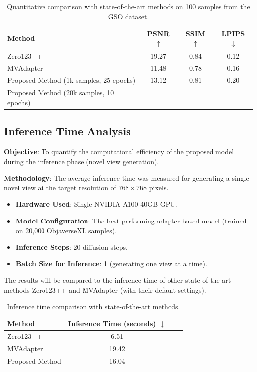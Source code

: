 \begin{table}[htbp]
  \centering
  \caption{Quantitative comparison with state-of-the-art methods on 100 samples from the GSO dataset.}
  \label{tab:sota_comparison_gso}
  \begin{tabular}{lccc}
    \toprule
    \textbf{Method} & \textbf{PSNR} $\uparrow$ & \textbf{SSIM} $\uparrow$ & \textbf{LPIPS} $\downarrow$ \\
    \midrule
    Zero123++ \cite{zero1to3} & 19.27 & 0.84 & 0.12 \\
    MVAdapter \cite{mvadapter} & 11.48 & 0.78 & 0.16 \\
    Proposed Method (1k samples, 25 epochs) & 13.12 & 0.81 & 0.20 \\
    Proposed Method (20k samples, 10 epochs) &  &  &  \\ %
    \bottomrule
  \end{tabular}
\end{table}

\subsection{Inference Time Analysis}\label{ssec:exp_inference_time}
\textbf{Objective}: To quantify the computational efficiency of the proposed model during the inference phase (novel view generation).

\textbf{Methodology}:
The average inference time was measured for generating a single novel view at the target resolution of $768 \times 768$ pixels.
\begin{itemize}
  \item \textbf{Hardware Used}: Single NVIDIA A100 40GB GPU.
  \item \textbf{Model Configuration}: The best performing adapter-based model (trained on 20,000 ObjaverseXL samples).
  \item \textbf{Inference Steps}: 20 diffusion steps.
  \item \textbf{Batch Size for Inference}: 1 (generating one view at a time).
\end{itemize}

The results will be compared to the inference time of other state-of-the-art methods Zero123++ \cite{zero1to3} and MVAdapter \cite{mvadapter} (with their default settings).

\begin{table}[htbp]
  \centering
  \caption{Inference time comparison with state-of-the-art methods.}
  \label{tab:inference_time_comparison}
  \begin{tabular}{lccc}
    \toprule
    \textbf{Method} & \textbf{Inference Time (seconds)} $\downarrow$ \\
    \midrule
    Zero123++ \cite{zero1to3} & 6.51 \\
    MVAdapter \cite{mvadapter} & 19.42 \\
    Proposed Method & 16.04 \\
    \bottomrule
  \end{tabular}
\end{table}

